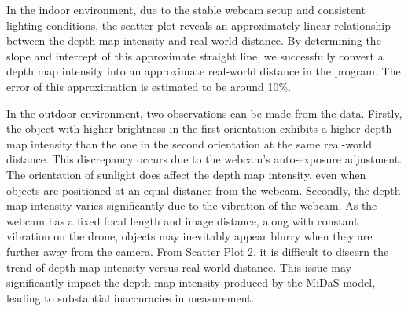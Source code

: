 \begin{figure}[H]
    \centering
\end{figure}


In the indoor environment, due to the stable webcam setup and consistent lighting conditions, the scatter plot reveals an approximately linear relationship between the depth map intensity and real-world distance. By determining the slope and intercept of this approximate straight line, we successfully convert a depth map intensity into an approximate real-world distance in the program. The error of this approximation is estimated to be around 10\%.

In the outdoor environment, two observations can be made from the data. Firstly, the object with higher brightness in the first orientation exhibits a higher depth map intensity than the one in the second orientation at the same real-world distance. This discrepancy occurs due to the webcam's auto-exposure adjustment. The orientation of sunlight does affect the depth map intensity, even when objects are positioned at an equal distance from the webcam. Secondly, the depth map intensity varies significantly due to the vibration of the webcam. As the webcam has a fixed focal length and image distance, along with constant vibration on the drone, objects may inevitably appear blurry when they are further away from the camera. From Scatter Plot 2, it is difficult to discern the trend of depth map intensity versus real-world distance. This issue may significantly impact the depth map intensity produced by the MiDaS model, leading to substantial inaccuracies in measurement.

